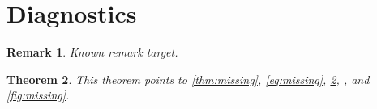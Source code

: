 \documentclass{amsart}
\newtheorem{theorem}{Theorem}
\newtheorem{remark}[theorem]{Remark}
\begin{document}
\section{Diagnostics}

\begin{remark}\label{rem:known}
Known remark target.
\end{remark}

\begin{theorem}\label{thm:main}
This theorem points to \ref{thm:missing}, \eqref{eq:missing}, \cref{thm:main}, , and \cref{fig:missing}.
\end{theorem}
\end{document}
